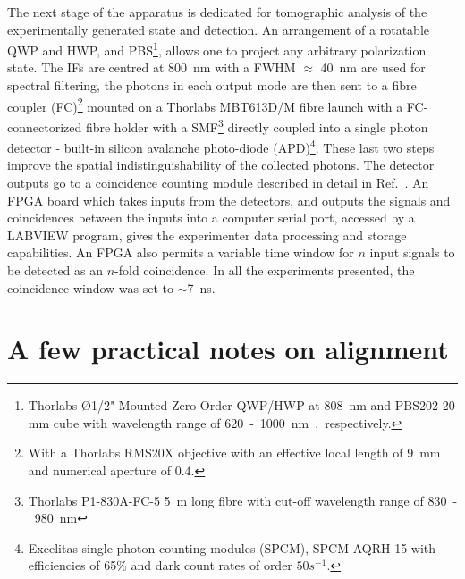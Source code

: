 \bigskip
\noindent
The next stage of the apparatus is dedicated for tomographic analysis of the experimentally generated state and detection. An arrangement of a rotatable \acs{QWP} and \acs{HWP}, and \acs{PBS}\footnote[][20pt]{Thorlabs Ø1/2" Mounted Zero-Order \acs{QWP}/\acs{HWP} at \SI{808}{nm} and PBS202 20 mm cube with wavelength range of \SI{620}-\SI{1000}{nm}, respectively.}, allows one to project any arbitrary polarization state. The \acs{IF}s are centred at \SI{800}{nm} with a \gls{FWHM} $\approx$ \SI{40}{nm} are used for spectral filtering, the photons in each output mode are then sent to a fibre coupler (FC)\footnote[][20pt]{With a Thorlabs RMS20X objective with an effective local length of \SI{9}{mm} and numerical aperture of $0.4$.} mounted on a Thorlabs MBT613D/M fibre launch with a FC-connectorized fibre holder with a \acs{SMF}\footnote[][20pt]{Thorlabs P1-830A-FC-5 \SI{5}{m} long fibre with cut-off wavelength range of \SI{830}-\SI{980}{nm}} directly coupled into a single photon detector - built-in silicon avalanche photo-diode (APD)\footnote[][20pt]{Excelitas single photon counting modules (SPCM), SPCM-AQRH-15 with efficiencies of 65\% and dark count rates of order $50s^{-1}$.}. These last two steps improve the spatial indistinguishability of the collected photons. The detector outputs go to a coincidence counting module described in detail in Ref.~\cite{Branning_2009}. An \gls{FPGA} board which takes inputs from the detectors, and outputs the signals and coincidences between the inputs into a computer serial port, accessed by a \textsf{LABVIEW} program, gives the experimenter data processing and storage capabilities. An \acs{FPGA} also permits a variable time window for $n$ input signals to be detected as an $n$-fold coincidence. In all the experiments presented, the coincidence window was set to $\sim$\SI{7}{ns}.

\section{A few practical notes on alignment}


